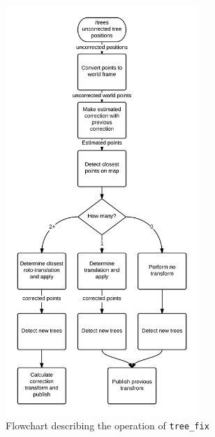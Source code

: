 \documentclass[12pt,oneside,a4paper]{book}
\begin{document}
\begin{figure}[h!]
  \centering
  \includegraphics[width=0.65\textwidth]{figs/tree_fix}
  \caption{Flowchart describing the operation of \texttt{tree\_fix}}
  \label{fig:tree_fix}
\end{figure}
\end{document}
